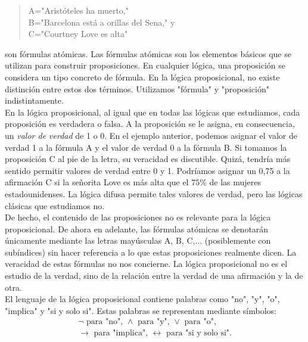 \documentclass[12pt,a4paper]{book}
\newcommand{\comillas}[1]{"#1"}
\begin{document}
    \begin{quote}
        A=\comillas{Aristóteles ha muerto,}\\
        B=\comillas{Barcelona está a orillas del Sena,} y\\
        C=\comillas{Courtney Love es alta}
    \end{quote}

    son fórmulas atómicas. Las fórmulas atómicas son los elementos básicos que se utilizan para construir
    proposiciones. En cualquier lógica, una proposición se considera un tipo concreto de fórmula. En la
    lógica proposicional, no existe distinción entre estos dos términos. Utilizamos \comillas{fórmula} y 
    \comillas{proposición} indistintamente.\\
    En la lógica proposicional, al igual que en todas las lógicas que estudiamos, cada proposición es verdadera
    o falsa. A la proposición se le asigna, en consecuencia, un \textit{valor de verdad} de 1 o 0. En el ejemplo anterior, podemos
    asignar el valor de verdad 1 a la fórmula A y el valor de verdad 0 a la fórmula B. Si tomamos la proposición C al pie de la letra,
    su veracidad es discutible. Quizá, tendría más sentido permitir valores de verdad entre 0 y 1. Podríamos asignar un 0,75 a la afirmación C
    si la señorita Love es más alta que el $75\%$ de las mujeres estadounidenses. La lógica difusa permite tales valores de verdad,
    pero las lógicas clásicas que estudiamos no.\\
    De hecho, el contenido de las proposiciones no es relevante para la lógica proposicional. De ahora en adelante, las fórmulas
    atómicas se denotarán únicamente mediante las letras mayúsculas A, B, C,$\dots$ (posiblemente con subíndices) sin hacer referencia a lo
    que estas proposiciones realmente dicen. La veracidad de estas fórmulas no nos concierne. La lógica proposicional no es el estudio de la verdad,
    sino de la relación entre la verdad de una afirmación y la de otra.\\
    El lenguaje de la lógica proposicional contiene palabras como \comillas{no}, \comillas{y}, \comillas{o}, \comillas{implica} y
    \comillas{si y solo si}. Estas palabras se representan mediante símbolos:
    \begin{gather*}
        \neg\text{ para \comillas{no}, }\land\text{ para \comillas{y}, }\lor\text{ para \comillas{o},}\\
        \rightarrow\text{ para \comillas{implica}, }\leftrightarrow\text{ para \comillas{si y solo si}.}
    \end{gather*}
\end{document}
